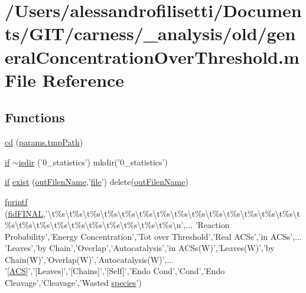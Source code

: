 \hypertarget{a00028}{\section{/\-Users/alessandrofilisetti/\-Documents/\-G\-I\-T/carness/\-\_\-analysis/old/general\-Concentration\-Over\-Threshold.m File Reference}
\label{a00028}
}
\subsection*{Functions}
\begin{DoxyCompactItemize}
\item 
\hyperlink{a00028_afb8c99b8f4d982428090b0b6ab07dafb}{cd} (\hyperlink{a00032_a1e5a4863ab2b87f923e1d19e2da1f5ac}{params.\-tmp\-Path})
\item 
\hyperlink{a00030_a01d55766b8058903dd360b4bda71f9f5}{if} \hyperlink{a00028_a8b0a903208664a3adb1355b79af314b4}{$\sim$isdir} ('0\-\_\-statistics') mkdir('0\-\_\-statistics')
\item 
\hyperlink{a00030_a01d55766b8058903dd360b4bda71f9f5}{if} \hyperlink{a00028_a1e641c44546ec25e735b887393dceb16}{exist} (\hyperlink{a00028_af42e186bcb2ad28b937ef14407da1f0d}{out\-Filen\-Name},'\hyperlink{a00068_a4e8353d6c62cf54bf4a1a8f63e56b8c3}{file}') delete(\hyperlink{a00028_af42e186bcb2ad28b937ef14407da1f0d}{out\-Filen\-Name})
\item 
\hyperlink{a00028_a6ffb0f3cb73c8f8faf0b5192942de203}{fprintf} (\hyperlink{a00028_a2f1bf22f6a0c3f5791577061e92c0433}{fid\-F\-I\-N\-A\-L},'\textbackslash{}t\%s\textbackslash{}t\%s\textbackslash{}t\%s\textbackslash{}t\%s\textbackslash{}t\%s\textbackslash{}t\%s\textbackslash{}t\%s\textbackslash{}t\%s\textbackslash{}t\%s\textbackslash{}t\%s\textbackslash{}t\%s\textbackslash{}t\%s\textbackslash{}t\%s\textbackslash{}t\%s\textbackslash{}t\%s\textbackslash{}t\%s\textbackslash{}t\%s\textbackslash{}t\%s\textbackslash{}t\%s\textbackslash{}t\%s\textbackslash{}t\%s\textbackslash{}t\%s\textbackslash{}t\%s\textbackslash{}t\%s\textbackslash{}n',... 'Reaction Probability','Energy Concentration','Tot over Threshold','Real A\-C\-Ss','in A\-C\-Ss',... 'Leaves','by Chain','Overlap','Autocatalysis','in A\-C\-Ss(W)','Leaves(W)','by Chain(W)','Overlap(W)','Autocatalysis(W)',... '\mbox{[}\hyperlink{a00028_ad72e1068795c577213481e5db7f3e925}{A\-C\-S}\mbox{]}','\mbox{[}Leaves\mbox{]}','\mbox{[}Chains\mbox{]}','\mbox{[}Self\mbox{]}','Endo Cond','Cond','Endo Cleavage','Cleavage','Wasted \hyperlink{a00022}{species}')

\end{DoxyCompactItemize}

